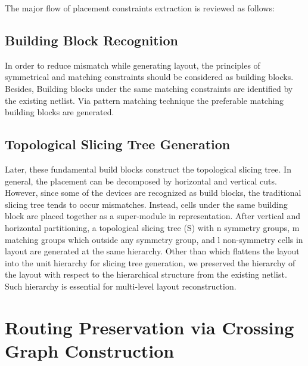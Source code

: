     The major flow of placement constraints extraction \cite{ALP_YPWeng_iccad2011} is reviewed as follows:
    \subsection{Building Block Recognition}
      In order to reduce mismatch while generating layout, the principles of symmetrical and matching constraints should be considered as building blocks. 
      Besides, Building blocks under the same matching constraints are identified by the existing netlist. Via pattern matching technique \cite{Massier_TCAD08} the preferable matching building blocks are generated.

    \subsection{Topological Slicing Tree Generation}
      Later, these fundamental build blocks construct the topological slicing tree. In general, the placement can be decomposed by horizontal and vertical cuts. However, since some of the devices are recognized as build blocks, the traditional slicing tree tends to occur mismatches. Instead, cells under the same building block are placed together as a super-module in representation. After vertical and horizontal  partitioning, a topological slicing tree (S) with n symmetry groups, m matching groups which outside any symmetry group, and l non-symmetry cells in layout are generated at the same hierarchy. Other than \cite{ALP_YPWeng_iccad2011} which flattens the layout into the unit hierarchy for slicing tree generation, we preserved the hierarchy of the layout with respect to the hierarchical structure from the existing netlist. Such hierarchy is essential for multi-level layout reconstruction. 




  \section{Routing Preservation via Crossing Graph Construction}\label{subsec:CGC}


